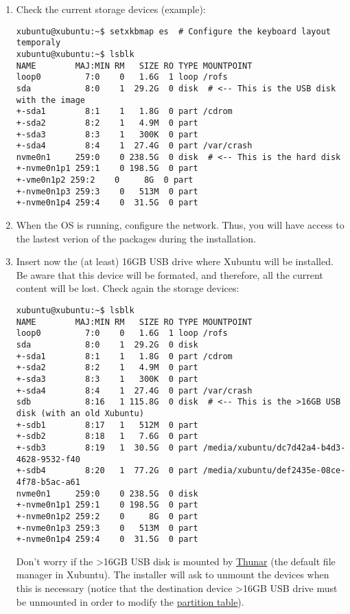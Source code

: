 \begin{enumerate}
\item Check the current storage devices (example):

\begin{verbatim}
xubuntu@xubuntu:~$ setxkbmap es  # Configure the keyboard layout temporaly
xubuntu@xubuntu:~$ lsblk
NAME        MAJ:MIN RM   SIZE RO TYPE MOUNTPOINT
loop0         7:0    0   1.6G  1 loop /rofs
sda           8:0    1  29.2G  0 disk  # <-- This is the USB disk with the image
+-sda1        8:1    1   1.8G  0 part /cdrom
+-sda2        8:2    1   4.9M  0 part
+-sda3        8:3    1   300K  0 part
+-sda4        8:4    1  27.4G  0 part /var/crash
nvme0n1     259:0    0 238.5G  0 disk  # <-- This is the hard disk
+-nvme0n1p1 259:1    0 198.5G  0 part
+-vme0n1p2 259:2    0     8G  0 part
+-nvme0n1p3 259:3    0   513M  0 part
+-nvme0n1p4 259:4    0  31.5G  0 part
\end{verbatim}
  
\item When the OS is running, configure the network. Thus, you will
  have access to the lastest verion of the packages during the
  installation.
  
\item Insert now the (at least) 16GB USB drive where Xubuntu will be
  installed. Be aware that this device will be formated, and
  therefore, all the current content will be lost. Check again the
  storage devices:

\begin{verbatim}
xubuntu@xubuntu:~$ lsblk
NAME        MAJ:MIN RM   SIZE RO TYPE MOUNTPOINT
loop0         7:0    0   1.6G  1 loop /rofs
sda           8:0    1  29.2G  0 disk
+-sda1        8:1    1   1.8G  0 part /cdrom
+-sda2        8:2    1   4.9M  0 part
+-sda3        8:3    1   300K  0 part
+-sda4        8:4    1  27.4G  0 part /var/crash
sdb           8:16   1 115.8G  0 disk  # <-- This is the >16GB USB disk (with an old Xubuntu)
+-sdb1        8:17   1   512M  0 part
+-sdb2        8:18   1   7.6G  0 part
+-sdb3        8:19   1  30.5G  0 part /media/xubuntu/dc7d42a4-b4d3-4628-9532-f40
+-sdb4        8:20   1  77.2G  0 part /media/xubuntu/def2435e-08ce-4f78-b5ac-a61
nvme0n1     259:0    0 238.5G  0 disk
+-nvme0n1p1 259:1    0 198.5G  0 part
+-nvme0n1p2 259:2    0     8G  0 part
+-nvme0n1p3 259:3    0   513M  0 part
+-nvme0n1p4 259:4    0  31.5G  0 part 
\end{verbatim}

  Don't worry if the >16GB USB disk is mounted by
  \href{https://gitlab.xfce.org/xfce/thunar}{Thunar} (the default file
  manager in Xubuntu). The installer will ask to unmount the devices
  when this is necessary (notice that the destination device >16GB USB
  drive must be unmounted in order to modify the
  \href{https://en.wikipedia.org/wiki/Disk_partitioning}{partition
    table}).
  

\end{enumerate}
